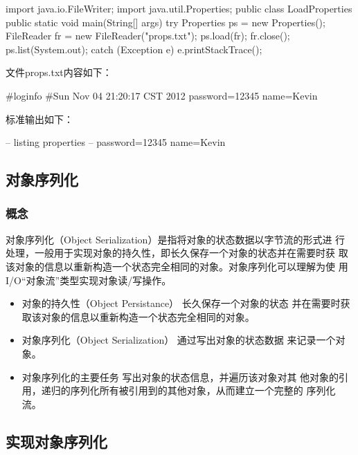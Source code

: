 
\begin{javaCode}
  import java.io.FileWriter;
  import java.util.Properties;
  public class LoadProperties {
    public static void main(String[] args) {
      try {
        Properties ps = new Properties();
        FileReader fr = new FileReader("props.txt");
        ps.load(fr);
        fr.close();
        ps.list(System.out);
      } catch (Exception e) {
        e.printStackTrace();
      }
    }
  }
\end{javaCode}

文件props.txt内容如下：

\begin{shCode}
#loginfo
#Sun Nov 04 21:20:17 CST 2012
password=12345
name=Kevin
\end{shCode}

标准输出如下：

\begin{stdoutCode}
-- listing properties --
password=12345
name=Kevin
\end{stdoutCode}



\subsection{对象序列化}

\subsubsection{概念}

对象序列化（Object Serialization）是指将对象的状态数据以字节流的形式进
行处理，一般用于实现对象的持久性，即长久保存一个对象的状态并在需要时获
取该对象的信息以重新构造一个状态完全相同的对象。对象序列化可以理解为使
用I/O“对象流”类型实现对象读/写操作。

\begin{itemize}\kai
\item {\hei 对象的持久性（Object Persistance）} 长久保存一个对象的状态
  并在需要时获取该对象的信息以重新构造一个状态完全相同的对象。
\item {\hei 对象序列化（Object Serialization）} 通过写出对象的状态数据
  来记录一个对象。
\item {\hei 对象序列化的主要任务} 写出对象的状态信息，并遍历该对象对其
  他对象的引用，递归的序列化所有被引用到的其他对象，从而建立一个完整的
  序列化流。
\end{itemize}

\subsection{实现对象序列化}

